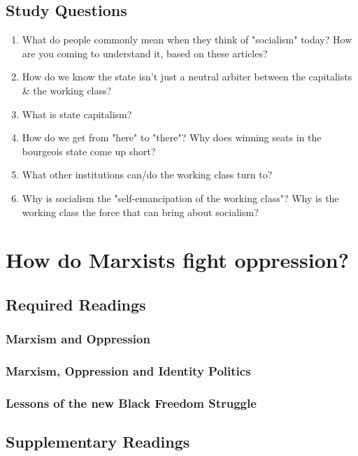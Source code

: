 \documentclass[12pt,a4paper]{report}
\begin{document}
\section{Study Questions}
\begin{enumerate}
	\item What do people commonly mean when they think of "socialism" today? How are you coming to understand it, based on these articles?
	\item How do we know the state isn't just a neutral arbiter between the capitalists \& the working class?
	\item What is state capitalism?
	\item How do we get from "here" to "there"? Why does winning seats in the bourgeois state come up short?
	\item What other institutions can/do the working class turn to?
	\item Why is socialism the "self-emancipation of the working class"? Why is the working class the force that can bring about socialism?
\end{enumerate}
\clearpage

\chapter{How do Marxists fight oppression?}
\section{Required Readings}
\subsection{Marxism and Oppression}

\clearpage

\subsection{Marxism, Oppression and Identity Politics}

\clearpage

\subsection{Lessons of the new Black Freedom Struggle}

\clearpage

\section{Supplementary Readings}
\end{document}
